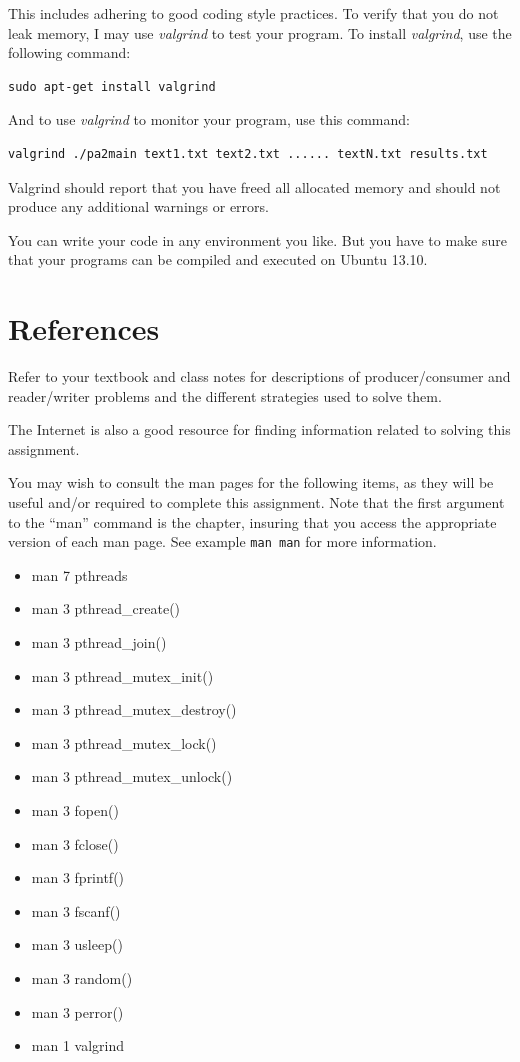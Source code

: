 \documentclass[12pt]{article}
\begin{document}
This includes adhering to good coding style practices. To verify that you do not leak memory, I may use
\textit{valgrind} to test your program. To install \textit{valgrind},
use the following command:

\begin{verbatim}
sudo apt-get install valgrind
\end{verbatim}

And to use \textit{valgrind} to monitor your program, use this
command:
\begin{verbatim}
valgrind ./pa2main text1.txt text2.txt ...... textN.txt results.txt
\end{verbatim}

Valgrind should report that you have freed all allocated memory and
should not produce any additional warnings or errors.

You can write your code in any environment you like. But you have to
make sure that your programs can be compiled and executed on Ubuntu 13.10.

\section{References}
Refer to your textbook and class notes for descriptions of producer/consumer and reader/writer problems and the different strategies used to solve them.

The Internet is also a good resource for finding information related to solving this assignment.

You may wish to consult the man pages for the following items, as they will be useful and/or required to complete this assignment. Note that the first argument to the ``man'' command is the chapter, insuring that you access the appropriate version of each man page. See example \texttt{man man} for more information.
\begin{itemize}
\item man 7 pthreads
\item man 3 pthread\_create()
\item man 3 pthread\_join()
\item man 3 pthread\_mutex\_init()
\item man 3 pthread\_mutex\_destroy()
\item man 3 pthread\_mutex\_lock()
\item man 3 pthread\_mutex\_unlock()
\item man 3 fopen()
\item man 3 fclose()
\item man 3 fprintf()
\item man 3 fscanf()
\item man 3 usleep()
\item man 3 random()
\item man 3 perror()
\item man 1 valgrind
\end{itemize}
\end{document}
